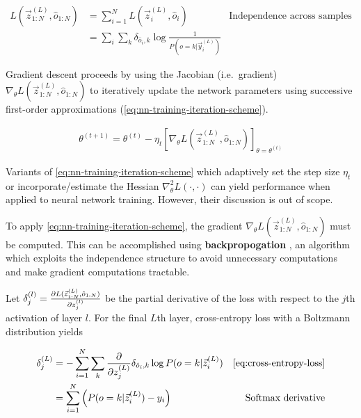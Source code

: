 \begin{align}
    L(\vec{z}^{(L)}_{1:N}, \hat{o}_{1:N})
    &= \sum_{i=1}^{N} L(\vec{z}^{(L)}_i, \hat{o}_i) &\mbox{Independence across samples} \nonumber\\
    &= \sum_i \sum_k \delta_{\hat{o}_i,k} \log \frac{1}{P(o=k | \vec{y}_i^{(L)})} & \label{eq:cross-entropy-loss}
\end{align}

Gradient descent proceeds by using the Jacobian (i.e.\ gradient) $\nabla_\theta
L(\vec{z}^{(L)}_{1:N}, \hat{o}_{1:N})$ to iteratively update the network
parameters using successive first-order approximations (\autoref{eq:nn-training-iteration-scheme}).

\begin{align}
    \label{eq:nn-training-iteration-scheme}
    \theta^{(t+1)} = \theta^{(t)}
    - \eta_t \left[ \nabla_\theta L(\vec{z}^{(L)}_{1:N}, \hat{o}_{1:N}) \right]_{\theta = \theta^{(t)}}
\end{align}

Variants of \autoref{eq:nn-training-iteration-scheme} which adaptively set the
step size $\eta_t$ or incorporate/estimate the Hessian $\nabla^2_{\theta}
L(\cdot, \cdot)$ can yield performance when applied to neural network training.
However, their discussion is out of scope. 

To apply \autoref{eq:nn-training-iteration-scheme}, the gradient $\nabla_\theta
L(\vec{z}^{(L)}_{1:N}, \hat{o}_{1:N})$ must be computed. This can be
accomplished using \textbf{backpropogation} , an algorithm which
exploits the independence structure to avoid unnecessary computations and make
gradient computations tractable.

Let $\delta^{(l)}_{j} = \frac{\partial L(\vec{z}^{(L)}_{1:N}, \hat{o}_{1:N})}{\partial
z^{(l)}_j}$ be the partial derivative of the loss with respect to the $j$th
activation of layer $l$. For the final $L$th layer, cross-entropy loss
with a Boltzmann distribution yields

\begin{align*}
    \delta^{(L)}_{j}
    &= - \sum_{i=1}^{N} \sum_{k} \frac{\pd}{\pd z^{(L)}_j} \delta_{\hat{o}_i,k} \log P(o=k | \vec{z}^{(L)}_i ) &\mbox{\autoref{eq:cross-entropy-loss}} \\
    &= \sum_{i=1}^{N} \left( P(o=k | \vec{z}^{(L)}_i ) - y_i \right) & \mbox{Softmax derivative}
\end{align*}

